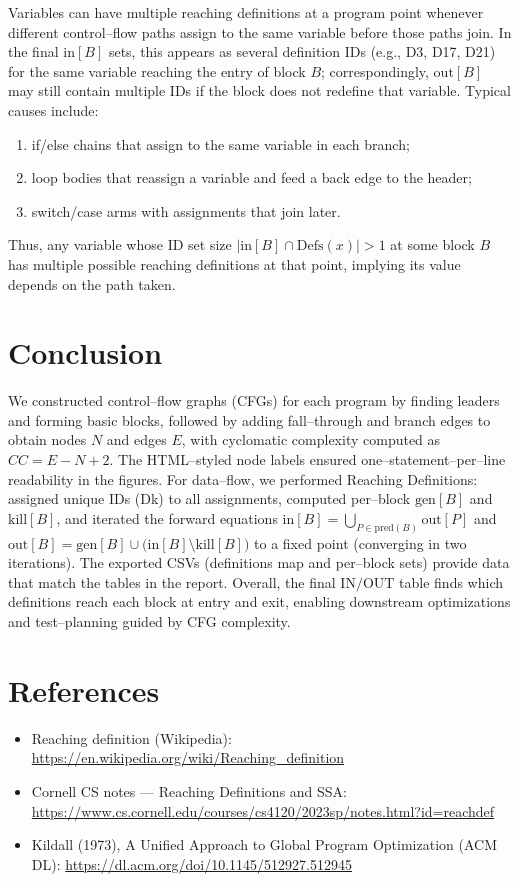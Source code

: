 \documentclass[12pt, a4paper]{report}
\begin{document}
\noindent
Variables can have multiple reaching definitions at a program point whenever different control–flow paths assign to the same variable before those paths join. In the final \(\mathrm{in}[B]\) sets, this appears as several definition IDs (e.g., D3, D17, D21) for the same variable reaching the entry of block \(B\); correspondingly, \(\mathrm{out}[B]\) may still contain multiple IDs if the block does not redefine that variable. Typical causes include:

\begin{enumerate}
    \item if/else chains that assign to the same variable in each branch;
    \item loop bodies that reassign a variable and feed a back edge to the header;
    \item switch/case arms with assignments that join later.
\end{enumerate}

Thus, any variable whose ID set size \(|\mathrm{in}[B] \cap \mathrm{Defs}(x)| > 1\) at some block \(B\) has multiple possible reaching definitions at that point, implying its value depends on the path taken.

\section*{Conclusion}
We constructed control–flow graphs (CFGs) for each program by finding leaders and forming basic blocks, followed by adding fall–through and branch edges to obtain nodes \(N\) and edges \(E\), with cyclomatic complexity computed as \(CC = E - N + 2\). The HTML–styled node labels ensured one–statement–per–line readability in the figures. For data–flow, we performed Reaching Definitions: assigned unique IDs (Dk) to all assignments, computed per–block \(\mathrm{gen}[B]\) and \(\mathrm{kill}[B]\), and iterated the forward equations \( \mathrm{in}[B] = \bigcup_{P \in \mathrm{pred}(B)} \mathrm{out}[P] \) and \( \mathrm{out}[B] = \mathrm{gen}[B] \cup \bigl(\mathrm{in}[B] \setminus \mathrm{kill}[B]\bigr) \) to a fixed point (converging in two iterations). The exported CSVs (definitions map and per–block sets) provide data that match the tables in the report. Overall, the final \(\mathrm{IN}/\mathrm{OUT}\) table finds which definitions reach each block at entry and exit, enabling downstream optimizations and test–planning guided by CFG complexity.



\section*{References}
\begin{itemize}
  \item Reaching definition (Wikipedia): \url{https://en.wikipedia.org/wiki/Reaching_definition}
  \item Cornell CS notes — Reaching Definitions and SSA: \url{https://www.cs.cornell.edu/courses/cs4120/2023sp/notes.html?id=reachdef}
  \item Kildall (1973), A Unified Approach to Global Program Optimization (ACM DL): \url{https://dl.acm.org/doi/10.1145/512927.512945}
\end{itemize}
\end{document}
